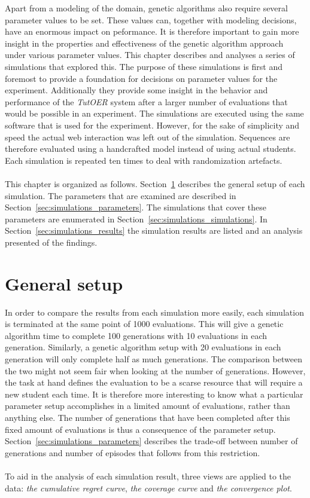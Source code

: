 Apart from a modeling of the domain, genetic algorithms also require several
parameter values to be set. These values can, together with modeling decisions,
have an enormous impact on peformance. It is therefore important to gain more
insight in the properties and effectiveness of the genetic algorithm approach
under various parameter values. This chapter describes and analyses a series of
simulations that explored this. The purpose of these simulations is first and
foremost to provide a foundation for decisions on parameter values for the
experiment. Additionally they provide some insight in the behavior and
performance of the \emph{TutOER} system after a larger number of evaluations
that would be possible in an experiment. The simulations are executed using the
same software that is used for the experiment. However, for the
sake of simplicity and speed the actual web interaction was left out of the
simulation. Sequences are therefore evaluated using a handcrafted model instead
of using actual students. Each simulation is repeated ten times to deal with
randomization artefacts.\\\\
\noindent
This chapter is organized as follows. Section~\ref{sec:simulations_setup}
describes the general setup of each simulation.
The parameters that are examined are described in
Section~\ref{sec:simulations_parameters}.  The simulations that cover these
parameters are enumerated in Section~\ref{sec:simulations_simulations}. In
Section~\ref{sec:simulations_results} the simulation results are listed and
an analysis presented of the findings.

\section{General setup}
\label{sec:simulations_setup}
In order to compare the results from each simulation more easily, each
simulation is terminated at the same point of 1000 evaluations. This will give
a genetic algorithm time to complete 100 generations with 10 evaluations in
each generation. Similarly, a genetic algorithm setup with 20 evaluations in
each generation will only complete half as much generations. The comparison
between the two might not seem fair when looking at the number of generations.
However, the task at hand defines the evaluation to be a scarse resource that
will require a new student each time. It is therefore more interesting to know
what a particular parameter setup accomplishes in a limited amount of
evaluations, rather than anything else. The number of generations that have
been completed after this fixed amount of evaluations is thus a consequence of
the parameter setup. Section~\ref{sec:simulations_parameters} describes the
trade-off between number of generations and number of episodes that follows
from this restriction.\\\\
\noindent
To aid in the analysis of each simulation result, three views are applied to
the data: \emph{the cumulative regret curve}, \emph{the coverage curve} and
\emph{the convergence plot}.
